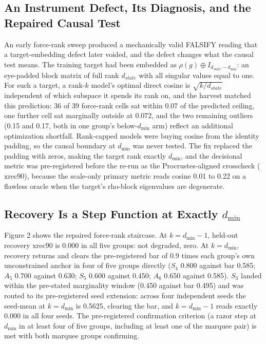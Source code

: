 \subsection{An Instrument Defect, Its Diagnosis, and the Repaired Causal Test}

An early force-rank sweep produced a mechanically valid FALSIFY reading
that a target-embedding defect later voided, and the defect changes
what the causal test means. The training target had been embedded as
$\rho(g) \oplus I_{d_{state}-d_{\min}}$: an eye-padded block matrix of
full rank $d_{state}$ with all singular values equal to one. For such a
target, a rank-$k$ model's optimal direct cosine is $\sqrt{k/d_{state}}$
independent of which subspace it spends its rank on, and the harvest
matched this prediction: 36 of 39 force-rank cells sat within 0.07 of
the predicted ceiling, one further cell sat marginally outside at
0.072, and the two remaining outliers (0.15 and 0.17, both in one
group's below-$d_{\min}$ arm) reflect an additional optimization
shortfall. Rank-capped models were
buying cosine from the identity padding, so the causal boundary at
$d_{\min}$ was never tested. The fix replaced the padding with zeros,
making the target rank exactly $d_{\min}$, and the decisional metric was
pre-registered before the re-run as the Procrustes-aligned crosscheck
($\mathrm{xrec90}$), because the scale-only primary metric reads cosine
0.01 to 0.22 on a flawless oracle when the target's rho-block
eigenvalues are degenerate.

\subsection{Recovery Is a Step Function at Exactly $d_{\min}$}

Figure 2 shows the repaired force-rank staircase. At $k = d_{\min}-1$,
held-out recovery $\mathrm{xrec90}$ is 0.000 in all five groups: not degraded, zero. At $k = d_{\min}$, recovery
returns and clears the pre-registered bar of 0.9 times each group's own
unconstrained anchor in four of five groups directly ($S_4$ 0.800
against bar 0.585; $A_5$ 0.700 against 0.630; $S_5$ 0.600 against 0.450;
$A_6$ 0.650 against 0.585). $S_3$ landed within
the pre-stated marginality window (0.450 against bar 0.495) and was
routed to its pre-registered seed extension: across four independent
seeds the seed-mean at $k = d_{\min}$ is 0.5625, clearing the bar, and
$k = d_{\min}-1$ reads exactly 0.000 in all four seeds. The pre-registered confirmation criterion (a
razor step at $d_{\min}$ in at least four of five groups, including at
least one of the marquee pair) is met with both marquee groups
confirming.

